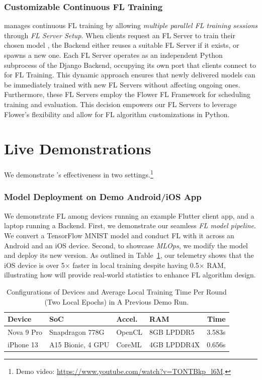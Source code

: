 \documentclass[conference]{IEEEtran}
\begin{document}
\subsubsection{Customizable Continuous FL Training}
\FedKit{} manages continuous FL training by allowing \textit{multiple parallel FL training sessions}
through \textit{FL Server Setup}.
When clients request an FL Server to
train their chosen model \model{},
the Backend either reuses a suitable FL Server \fs{} if it exists,
or spawns a new one.
Each FL Server
operates as an independent Python subprocess of the Django Backend,
occupying its own port that
clients connect to for FL Training.
This dynamic approach ensures that
newly delivered models can be immediately trained with new FL Servers
without affecting ongoing ones.
Furthermore,
these FL Servers employ the Flower FL Framework for
scheduling training and evaluation.
This decision empowers our FL Servers to leverage Flower's flexibility and
allow for FL algorithm customizations in Python.

\section{Live Demonstrations}

We demonstrate \FedKit{}'s effectiveness in two settings.\footnote{
    Demo video: \url{https://www.youtube.com/watch?v=TONTBkp_l6M}.
}

\subsubsection{Model Deployment on Demo Android/iOS App}
We demonstrate FL among
devices running an example Flutter client app,
and a laptop running a \FedKit{} Backend.
First, we demonstrate our seamless \textit{FL model pipeline}.
We convert a TensorFlow MNIST model and
conduct FL with it across an Android and an iOS device.
Second, to showcase \textit{MLOps},
we modify the model and deploy its new version.
As outlined in Table~\ref{tbl:demo-stats},
our telemetry shows that
the iOS device is over 5$\times$ faster in local training despite
having 0.5$\times$ RAM,
illustrating how \FedKit{} will provide real-world statistics to
enhance FL algorithm design.

\begin{table}
    \centering
    \setlength{\tabcolsep}{4pt}
\begin{tabular}{llllr}
Device      & SoC               & Accel.        & RAM           & Time   \\\hline
Nova 9 Pro  & Snapdragon 778G   & OpenCL        & 8GB LPDDR5    & 3.583s \\
iPhone 13   & A15 Bionic, 4 GPU & CoreML        & 4GB LPDDR4X   & 0.656s \\
\end{tabular}
\caption{Configurations of Devices and Average Local Training Time Per Round
    (Two Local Epochs) in A Previous Demo Run.
}
\label{tbl:demo-stats}
\end{table}
\end{document}
